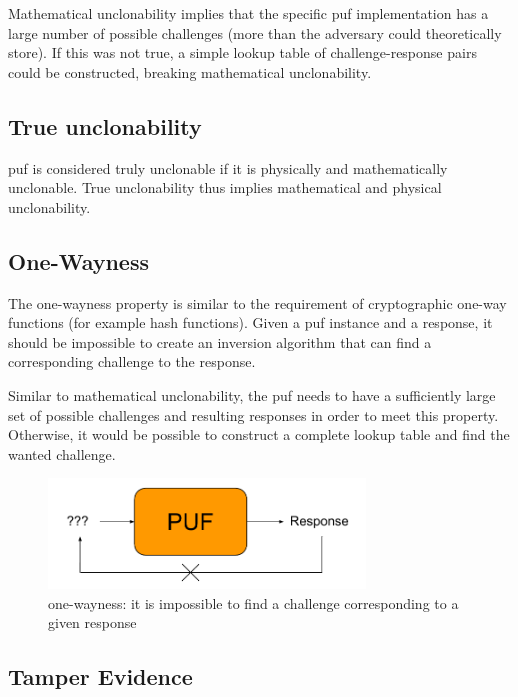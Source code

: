 Mathematical unclonability implies that the specific \gls{puf} implementation has a large number of possible challenges (more than the adversary could theoretically store). If this was not true, a simple lookup table of challenge-response pairs could be constructed, breaking mathematical unclonability. %

\subsection*{True unclonability}

\gls{puf} is considered truly unclonable if it is physically and mathematically unclonable. True unclonability thus implies mathematical and physical unclonability.

\subsection*{One-Wayness}

The one-wayness property is similar to the requirement of cryptographic one-way functions (for example hash functions). Given a \gls{puf} instance and a response, it should be impossible to create an inversion algorithm that can find a corresponding challenge to the response.

Similar to mathematical unclonability, the \gls{puf} needs to have a sufficiently large set of possible challenges and resulting responses in order to meet this property. Otherwise, it would be possible to construct a complete lookup table and find the wanted challenge.

\begin{figure}[h!]
    \centering
    \captionsetup{justification=centering,margin=0.5cm}
    \includegraphics[width=0.75\textwidth]{images/one-wayness}
    \caption{one-wayness: it is impossible to find a challenge corresponding to a given response}
    \label{fig:one-wayness}
\end{figure}

\subsection*{Tamper Evidence}

